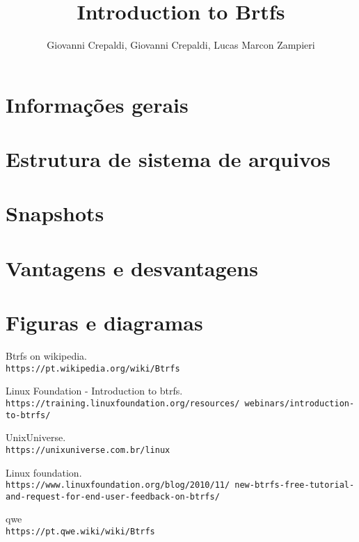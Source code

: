 \documentclass[12pt]{article}
\title{Introduction to Brtfs}
\author{Giovanni Crepaldi\inst{1}, Giovanni Crepaldi\inst{2}, Lucas Marcon Zampieri\inst{3}}
\begin{document}
\maketitle

\begin{abstract}

\end{abstract}

\begin{resumo}

\end{resumo}

\section{Informações gerais} \label{sec:firstpage}

\section{Estrutura de sistema de arquivos}

\section{Snapshots}

\section{Vantagens e desvantagens}

\section{Figuras e diagramas}\label{sec:figs}

\begin{thebibliography}{9}
Btrfs on wikipedia.
\\\texttt{https://pt.wikipedia.org/wiki/Btrfs}

Linux Foundation - Introduction to btrfs.
\\\texttt{https://training.linuxfoundation.org/resources/\
webinars/introduction-to-btrfs/}

UnixUniverse.
\\\texttt{https://unixuniverse.com.br/linux}

Linux foundation.
\\\texttt{https://www.linuxfoundation.org/blog/2010/11/\
new-btrfs-free-tutorial-and-request-for-end-user-feedback-on-btrfs/}

\bibitem{qwe}
qwe
\\\texttt{https://pt.qwe.wiki/wiki/Btrfs}

\end{thebibliography}
\end{document}
